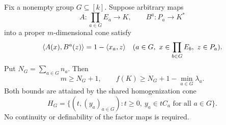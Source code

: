 \begin{theorem}
\label{thm:whole-row-caps}
Fix a nonempty group $G\subseteq[k]$. Suppose arbitrary maps
\[
 A:\prod_{a\in G}E_a\longrightarrow K,\qquad
 B^a:P_a\longrightarrow K^*
\]
into a proper $m$-dimensional cone satisfy
\begin{equation}\label{eq:whole-row-slack}
 \langle A(x),B^a(z)\rangle=1-\langle x_a,z\rangle
 \quad(a\in G,\ x\in\prod_{b\in G}E_b,\ z\in P_a).
\end{equation}
Put $N_G=\sum_{a\in G}n_a$. Then
\begin{equation}\label{eq:whole-row-bounds}
 m\geq N_G+1,\qquad f(K)\geq N_G+1-\min_{a\in G}\lambda_a.
\end{equation}
Both bounds are attained by the shared homogenization cone
\begin{equation}\label{eq:shared-homogenization}
 H_G=\{(t,(y_a)_{a\in G}):t\geq0,\ y_a\in tC_a\text{ for all }a\in G\}.
\end{equation}
No continuity or definability of the factor maps is required.
\end{theorem}
